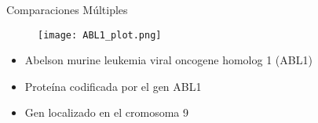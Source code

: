 \documentclass{beamer}
\begin{document}
\begin{frame}[fragile]{Comparaciones Múltiples}
\begin{figure}[H]
\centering
\texttt{[image: ABL1\_plot.png]}
\end{figure}
\begin{itemize}
\item Abelson murine leukemia viral oncogene homolog 1 (ABL1) 
\item Proteína codificada por el gen ABL1
\item Gen localizado en el cromosoma 9
\end{itemize}
\end{frame}
\end{document}
